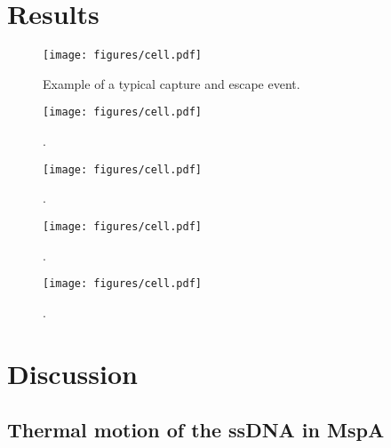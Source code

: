 \section{Results}

\begin{figure}[h]
\begin{centering}
\texttt{[image: figures/cell.pdf]}
\caption[Capture and escape measurement]{Example of a typical capture and escape event.}
\label{fig:capture_escape_event}
\end{centering}
\end{figure}

\begin{figure}[h]
\begin{centering}
\texttt{[image: figures/cell.pdf]}
\caption[Measured escape times of ssDNA from MspA]{.}
\label{fig:escape_times}
\end{centering}
\end{figure}

\begin{figure}[h]
\begin{centering}
\texttt{[image: figures/cell.pdf]}
\caption[Current blockages for homopolymer ssDNA]{.}
\label{fig:homopolymer_blockages}
\end{centering}
\end{figure}

\begin{figure}[h]
\begin{centering}
\texttt{[image: figures/cell.pdf]}
\caption[Current fluctuations for poly(dC) ssDNA]{.}
\label{fig:polyC_fluctuations}
\end{centering}
\end{figure}

\begin{figure}[h]
\begin{centering}
\texttt{[image: figures/cell.pdf]}
\caption[Current fluctuations for all homopolymer ssDNA]{.}
\label{fig:homopolymer_fluctuations}
\end{centering}
\end{figure}

\section{Discussion}

\subsection{Thermal motion of the ssDNA in MspA}

